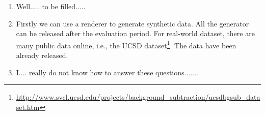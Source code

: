 \begin{enumerate}[i]
\item Well......to be filled.....
\item Firstly we can use a renderer to generate synthetic data. All the generator can be released after the evaluation period. For real-world dataset, there are many public data online, i.e., the UCSD dataset\footnote{\url{http://www.svcl.ucsd.edu/projects/background_subtraction/ucsdbgsub_dataset.htm}}.
    The data have been already released. 
\item I.... really do not know how to answer these questions.......
\end{enumerate} 
